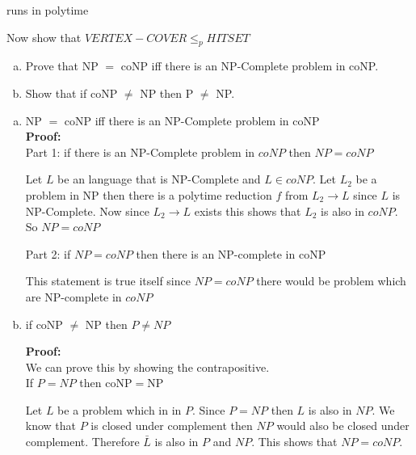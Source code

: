 \documentclass[12pt]{exam}
\begin{document}
\begin{questions}
\begin{solution}
    runs in polytime

    Now show that $VERTEX-COVER \leq_{p} HITSET$




  \end{solution}

  \question{} %

  \begin{enumerate}[a.]
    \item Prove that NP $=$ coNP iff there is an NP-Complete problem in coNP.
    \item Show that if coNP $\neq$ NP then P $\neq$ NP.
  \end{enumerate}


  \begin{solution}
    \begin{enumerate}[a.]
      \item NP $=$ coNP iff there is an NP-Complete problem in coNP\\

            \textbf{Proof:}\\
            Part 1: if there is an NP-Complete problem in $coNP$ then $NP=coNP$


            Let $L$ be an language that is NP-Complete and $L\in coNP$.
            Let $L_{2}$ be a problem in NP then there is a polytime reduction $f$ from $L_{2} \to L$ since $L$ is NP-Complete.
            Now since $L_{2}\to L$ exists this shows that $L_{2}$ is also in $coNP$. So $NP=coNP$


            Part 2: if $NP=coNP$ then there is an NP-complete in coNP

            This statement is true itself since $NP=coNP$ there would be problem which are NP-complete in $coNP$


      \item if coNP $\neq$ NP then $P\neq NP$

            \textbf{Proof:}\\

            We can prove this by showing the contrapositive.\\
            If $P=NP$ then coNP$=$NP

            Let $L$ be a problem which in in $P$. Since $P=NP$ then $L$ is also in $NP$. We know that $P$ is closed under complement then $NP$ would also be closed under complement. Therefore $\bar L$ is also in $P$ and $NP$. This shows that $NP = coNP$.

    \end{enumerate}


\end{solution}
\end{questions}
\end{document}
